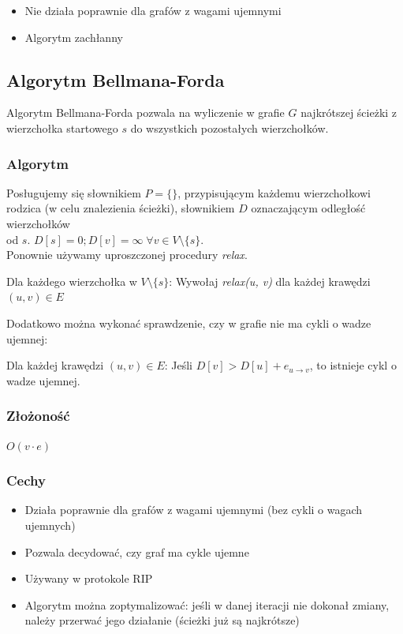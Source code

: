 \documentclass[12pt]{article}
\begin{document}
    \begin{itemize}
        \item Nie działa poprawnie dla grafów z wagami ujemnymi
        \item Algorytm zachłanny
    \end{itemize}

    \subsection{Algorytm Bellmana-Forda}

    Algorytm Bellmana-Forda pozwala na wyliczenie w grafie $G$ najkrótszej ścieżki z
    wierzchołka startowego $s$ do wszystkich pozostałych wierzchołków.

    \subsubsection{Algorytm}

    Posługujemy się słownikiem $P = \{\}$, przypisującym każdemu wierzchołkowi
    rodzica (w celu znalezienia ścieżki), słownikiem $D$ oznaczającym odległość
    wierzchołków\\ od $s$. $D[s] = 0; D[v] = \infty \; \forall v \in V \setminus \{s\}$.
    \[\]
    Ponownie używamy uproszczonej procedury \textit{relax}.

    \[\]
    Dla każdego wierzchołka w $V \setminus \{s\}$:
    \vskip 0pt Wywołaj \textit{relax(u, v)} dla każdej krawędzi $(u, v) \in E$
    \[\]

    Dodatkowo można wykonać sprawdzenie, czy w grafie nie ma cykli o wadze ujemnej:

    \[\]
    Dla każdej krawędzi $(u, v) \in E$:
    \vskip 0pt Jeśli $D[v] > D[u] + e_{u \rightarrow v}$, to
    istnieje cykl o wadze ujemnej.
    \subsubsection{Złożoność}

    $O(v \cdot e)$

    \subsubsection{Cechy}

    \begin{itemize}
        \item Działa poprawnie dla grafów z wagami ujemnymi (bez cykli o wagach ujemnych)
        \item Pozwala decydować, czy graf ma cykle ujemne
        \item Używany w protokole RIP
        \item Algorytm można zoptymalizować: jeśli w danej iteracji nie dokonał zmiany,
        należy przerwać jego działanie (ścieżki już są najkrótsze)
    \end{itemize}
\end{document}
